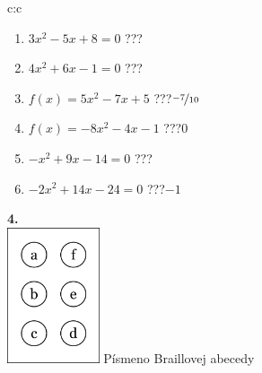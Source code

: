 \documentclass[10pt]{report}
\begin{document}
\begin{tabular}{c:c}
\begin{minipage}[c][104.5mm][t]{0.5\linewidth}
\begin{center}
\begin{minipage}{0.79\linewidth}
\begin{center}
\begin{varwidth}{\linewidth}
\begin{enumerate}
\Large
\item $3x^2-5x+8=0$\quad \dotfill\; ???\;\dotfill {}
\item $4x^2+6x-1=0$\quad \dotfill\; ???\;\dotfill {}
\item $f(x)=5x^2-7x+5$\quad \dotfill\; ???\;\dotfill \quad $\nicefrac{-7}{10}$
\item $f(x)=-8x^2-4x-1$\quad \dotfill\; ???\;\dotfill \quad $0$
\item $-x^2+9x-14=0$\quad \dotfill\; ???\;\dotfill {}
\item $-2x^2+14x-24=0$\quad \dotfill\; ???\;\dotfill \quad $-1$
\end{enumerate}
\end{varwidth}
\end{center}
\end{minipage}
\begin{minipage}{0.20\linewidth}
\begin{center}
{\Huge\bfseries 4.} \\[2mm]
\includegraphics[height=40mm]{../images/braille.png}
{\small Písmeno Braillovej abecedy}
\end{center}
\end{minipage}
\end{center}
\end{minipage}
%
\end{tabular}
\newpage
\end{document}
